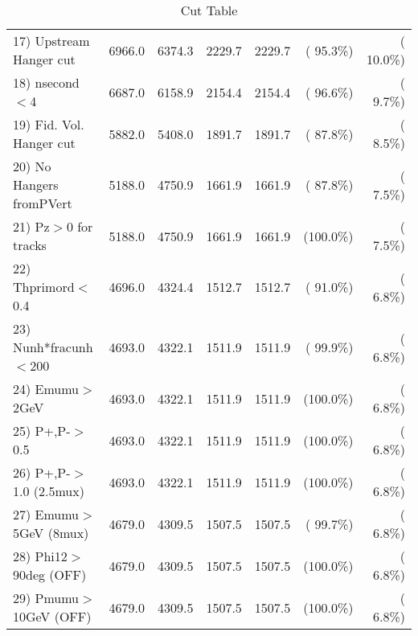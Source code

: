 \begin{table}[h!]
\begin{tabular}{||l||r|r|r|r|r|r||}
 17) Upstream Hanger cut  &       6966.0 &       6374.3 &       2229.7 &       2229.7 & ( 95.3\%) & ( 10.0\%) \\
 18) nsecond$<$4          &       6687.0 &       6158.9 &       2154.4 &       2154.4 & ( 96.6\%) & (  9.7\%) \\
 19) Fid. Vol. Hanger cut &       5882.0 &       5408.0 &       1891.7 &       1891.7 & ( 87.8\%) & (  8.5\%) \\
 20) No Hangers fromPVert &       5188.0 &       4750.9 &       1661.9 &       1661.9 & ( 87.8\%) & (  7.5\%) \\
 21) Pz$>$0 for tracks    &       5188.0 &       4750.9 &       1661.9 &       1661.9 & (100.0\%) & (  7.5\%) \\
 22) Thprimord$<$0.4      &       4696.0 &       4324.4 &       1512.7 &       1512.7 & ( 91.0\%) & (  6.8\%) \\
 23) Nunh*fracunh$<$200   &       4693.0 &       4322.1 &       1511.9 &       1511.9 & ( 99.9\%) & (  6.8\%) \\
 24) Emumu$>$2GeV         &       4693.0 &       4322.1 &       1511.9 &       1511.9 & (100.0\%) & (  6.8\%) \\
 25) P+,P-$>$0.5          &       4693.0 &       4322.1 &       1511.9 &       1511.9 & (100.0\%) & (  6.8\%) \\
 26) P+,P-$>$1.0 (2.5mux) &       4693.0 &       4322.1 &       1511.9 &       1511.9 & (100.0\%) & (  6.8\%) \\
 27) Emumu$>$5GeV  (8mux) &       4679.0 &       4309.5 &       1507.5 &       1507.5 & ( 99.7\%) & (  6.8\%) \\
 28) Phi12$>$90deg  (OFF) &       4679.0 &       4309.5 &       1507.5 &       1507.5 & (100.0\%) & (  6.8\%) \\
 29) Pmumu$>$10GeV  (OFF) &       4679.0 &       4309.5 &       1507.5 &       1507.5 & (100.0\%) & (  6.8\%) \\
 \hline
 \hline
 \end{tabular}
 \caption{Cut Table           }
 \label{tab-cutcohjpsi-mumu_ccdis}
 \end{table}
